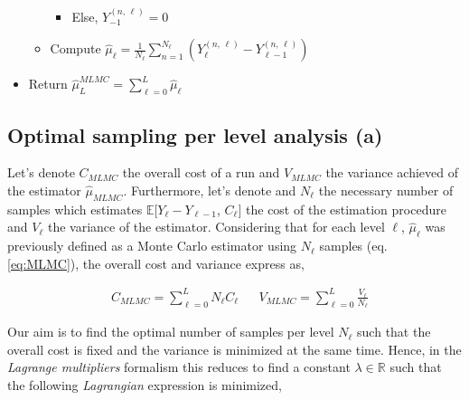 \begin{itemize}
\begin{itemize}
\begin{itemize}
\begin{itemize}
        \end{itemize}

        \item Else, \begin{math}
            Y_{-1}^{(n ,\, \ell)} = 0
        \end{math}

        \end{itemize}
        
        \item Compute \begin{math}
            \hat{\mu}_{\ell} = \frac{1}{N_{\ell}} \sum\limits_{n = 1}^{N_{\ell}} ( Y_{\ell}^{(n,\,\ell)} - Y_{\ell-1}^{(n,\,\ell)} )
        \end{math}
    \end{itemize}
    \item Return \begin{math}\hat{\mu}_{L}^{MLMC} = \sum\limits_{\ell = 0}^{L} \hat{\mu}_{\ell} \end{math}
\end{itemize}

\subsection{Optimal sampling per level analysis (a)}

Let's denote $C_{MLMC}$ the overall cost of a run and $V_{MLMC}$ the variance achieved of the estimator $\hat{\mu}_{MLMC}$.
Furthermore, let's denote and $N_\ell$ the necessary number of samples which estimates $\mathbb{E}[Y_\ell - Y_{\ell-1}$, $C_\ell]$ the cost of the estimation procedure and $V_\ell$ the variance of the estimator. Considering that for each level $\ell$, $\hat{\mu}_\ell$ was previously defined as a Monte Carlo estimator using $N_\ell$ samples (eq. \ref{eq:MLMC}), the overall cost and variance express as,

\begin{align}\label{eq:mlmc_overall}
&C_{MLMC} = \sum_{\ell=0}^L N_\ell C_\ell &
&V_{MLMC} = \sum_{\ell=0}^L \frac{V_\ell}{N_\ell}
\end{align}

Our aim is to find the optimal number of samples per level $N_\ell$ such that the overall cost is fixed and the variance is minimized at the same time. Hence, in the \textit{Lagrange multipliers} formalism this reduces to find a constant $\lambda \in \mathbb{R}$ such that the following \textit{Lagrangian} expression is minimized,

